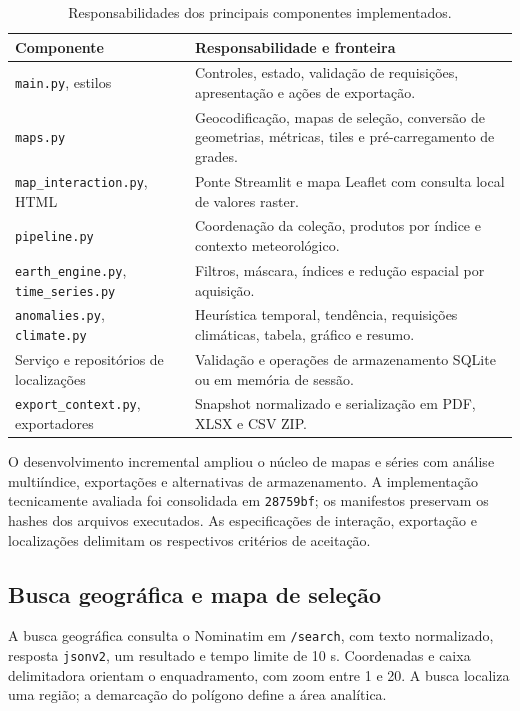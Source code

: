 \begin{table}[htbp]
\centering\small
\caption{Responsabilidades dos principais componentes implementados.}
\label{tab:componentes-final}
\begin{tabular}{p{}p{}}
\hline
\textbf{Componente} & \textbf{Responsabilidade e fronteira} \\ \hline
\texttt{main.py}, estilos & Controles, estado, validação de requisições, apresentação e ações de exportação. \\
\texttt{maps.py} & Geocodificação, mapas de seleção, conversão de geometrias, métricas, tiles e pré-carregamento de grades. \\
\texttt{map\_interaction.py}, HTML & Ponte Streamlit e mapa Leaflet com consulta local de valores raster. \\
\texttt{pipeline.py} & Coordenação da coleção, produtos por índice e contexto meteorológico. \\
\texttt{earth\_engine.py}, \texttt{time\_series.py} & Filtros, máscara, índices e redução espacial por aquisição. \\
\texttt{anomalies.py}, \texttt{climate.py} & Heurística temporal, tendência, requisições climáticas, tabela, gráfico e resumo. \\
Serviço e repositórios de localizações & Validação e operações de armazenamento SQLite ou em memória de sessão. \\
\texttt{export\_context.py}, exportadores & Snapshot normalizado e serialização em PDF, XLSX e CSV ZIP. \\ \hline
\end{tabular}
\end{table}

O desenvolvimento incremental ampliou o núcleo de mapas e séries com análise multiíndice, exportações e alternativas de armazenamento. A implementação tecnicamente avaliada foi consolidada em \texttt{28759bf}; os manifestos preservam os hashes dos arquivos executados. As especificações de interação, exportação e localizações delimitam os respectivos critérios de aceitação.

\subsection{Busca geográfica e mapa de seleção}

A busca geográfica consulta o Nominatim em \texttt{/search}, com texto normalizado, resposta \texttt{jsonv2}, um resultado e tempo limite de 10 s. Coordenadas e caixa delimitadora orientam o enquadramento, com zoom entre 1 e 20. A busca localiza uma região; a demarcação do polígono define a área analítica.

